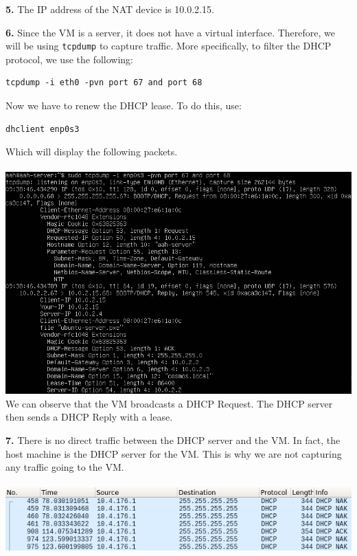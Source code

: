 \documentclass[12pt]{extarticle}
\begin{document}
\textbf{5.} The IP address of the NAT device is 10.0.2.15.

\textbf{6.} Since the VM is a server, it does not have a virtual interface. Therefore, we will be using \texttt{tcpdump} to capture traffic. More specifically, to filter the DHCP protocol, we use the following:
\begin{verbatim}
tcpdump -i eth0 -pvn port 67 and port 68
\end{verbatim}
Now we have to renew the DHCP lease. To do this, use:
\begin{verbatim}
dhclient enp0s3
\end{verbatim}
Which will display the following packets.\\~\\
\includegraphics[scale=0.5]{resources/1-5.png}\\
We can observe that the VM broadcasts a DHCP Request. The DHCP server then sends a DHCP Reply with a lease.

\textbf{7.} There is no direct traffic between the DHCP server and the VM. In fact, the host machine is the DHCP server for the VM. This is why we are not capturing any traffic going to the VM.\\~\\
\includegraphics[scale=0.6]{resources/1-7.png}\\
\end{document}
